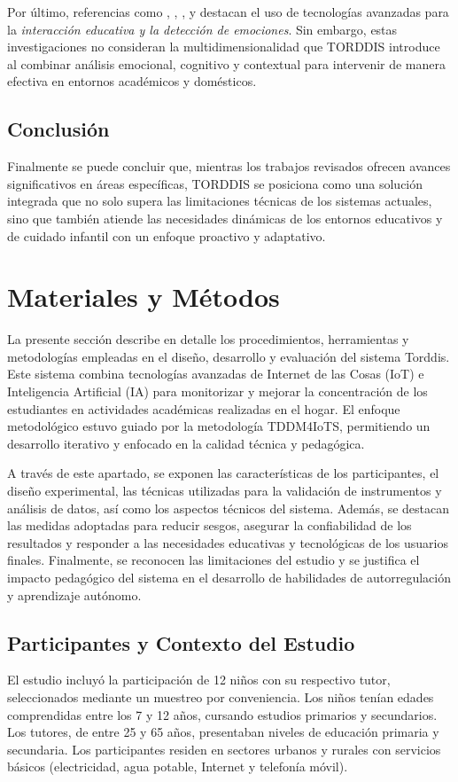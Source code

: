 \documentclass[a4paper,fleqn]{cas-sc}
\begin{document}
				Por último, referencias como \cite{Kulkarni2023 }, \cite{Enadula2021}, \cite{Ozdamli2022}, y \cite{Warren2015Brief} destacan el uso de tecnologías avanzadas para la \textit{interacción educativa y la detección de emociones}. Sin embargo, estas investigaciones no consideran la multidimensionalidad que TORDDIS introduce al combinar análisis emocional, cognitivo y contextual para intervenir de manera efectiva en entornos académicos y domésticos.
				
			\subsection{Conclusión}
				Finalmente se puede concluir que, mientras los trabajos revisados ofrecen avances significativos en áreas específicas, TORDDIS se posiciona como una solución integrada que no solo supera las limitaciones técnicas de los sistemas actuales, sino que también atiende las necesidades dinámicas de los entornos educativos y de cuidado infantil con un enfoque proactivo y adaptativo.
			
	\section{Materiales y Métodos}
	\label{seccion:Cuatro}
		La presente sección describe en detalle los procedimientos, herramientas y metodologías empleadas en el diseño, desarrollo y evaluación del sistema Torddis. Este sistema combina tecnologías avanzadas de Internet de las Cosas (IoT) e Inteligencia Artificial (IA) para monitorizar y mejorar la concentración de los estudiantes en actividades académicas realizadas en el hogar. El enfoque metodológico estuvo guiado por la metodología TDDM4IoTS, permitiendo un desarrollo iterativo y enfocado en la calidad técnica y pedagógica.
		
		A través de este apartado, se exponen las características de los participantes, el diseño experimental, las técnicas utilizadas para la validación de instrumentos y análisis de datos, así como los aspectos técnicos del sistema. Además, se destacan las medidas adoptadas para reducir sesgos, asegurar la confiabilidad de los resultados y responder a las necesidades educativas y tecnológicas de los usuarios finales. Finalmente, se reconocen las limitaciones del estudio y se justifica el impacto pedagógico del sistema en el desarrollo de habilidades de autorregulación y aprendizaje autónomo.
		
		\subsection{Participantes y Contexto del Estudio}
			El estudio incluyó la participación de 12 niños con su respectivo tutor, seleccionados mediante un muestreo por conveniencia. Los niños tenían edades comprendidas entre los 7 y 12 años, cursando estudios primarios y secundarios. Los tutores, de entre 25 y 65 años, presentaban niveles de educación primaria y secundaria. Los participantes residen en sectores urbanos y rurales con servicios básicos (electricidad, agua potable, Internet y telefonía móvil).
				
\end{document}
